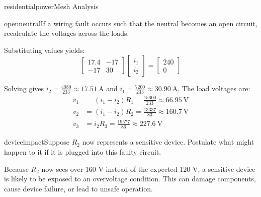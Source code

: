 \begin{mainquestion}{residentialpower}{Mesh Analysis}
\begin{partquestion}{openneutral}{If a wiring fault occurs such that the neutral becomes an open circuit, recalculate the voltages across the loads.}
\begin{answer}
Substituting values yields:
\[
\begin{bmatrix}
17.4 & -17\\
-17 & 30
\end{bmatrix}
\begin{bmatrix}
i_1 \\
i_2
\end{bmatrix}
=
\begin{bmatrix}
240 \\
0
\end{bmatrix}
\]

Solving gives $i_{2} = \frac{4080}{233} \approx \qty{17.51}{\ampere}$ and $i_{1} = \frac{7200}{233} \approx \qty{30.90}{\ampere}$. The load voltages are:
\begin{align*}
v_{1} &= (i_{1}-i_{2})R_1 = \frac{15600}{233} \approx \qty{66.95}{\volt} \\
v_{2} &= (i_{1}-i_{2})R_2 = \frac{13337}{83} \approx \qty{160.7}{\volt} \\
v_{3} &= i_{2} R_3 = \frac{19577}{86} \approx \qty{227.6}{\volt}
\end{align*}
\end{answer}
\end{partquestion}

\begin{partquestion}{deviceimpact}{Suppose $R_2$ now represents a sensitive device. Postulate what might happen to it if it is plugged into this faulty circuit.}
\begin{answer}
Because $R_{2}$ now sees over 160 V instead of the expected 120 V, a sensitive device is likely to be exposed to an overvoltage condition. This can damage components, cause device failure, or lead to unsafe operation.
\end{answer}
\end{partquestion}

\end{mainquestion}

